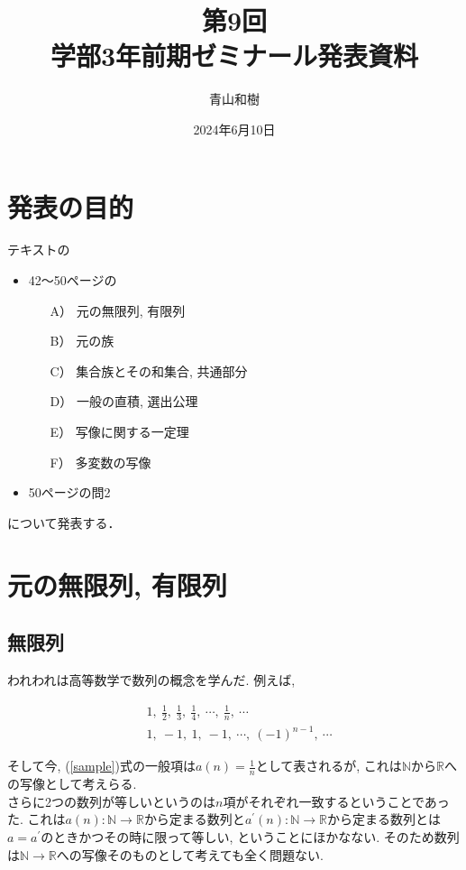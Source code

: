 \documentclass[a4j]{jsarticle}
\title{第9回\\学部3年前期ゼミナール発表資料}
\author{青山和樹}
\date{2024年6月10日}
\begin{document}
\maketitle

\section*{発表の目的}
テキスト\cite{text}の
\begin{itemize}
  \item 42～50ページの
        \begin{itemize}
          \item[A）] 元の無限列, 有限列
          \item[B）] 元の族
          \item[C）] 集合族とその和集合, 共通部分
          \item[D）] 一般の直積, 選出公理
          \item[E）] 写像に関する一定理
          \item[F）] 多変数の写像
        \end{itemize}
  \item 50ページの問2
\end{itemize}
について発表する．

\tableofcontents

\clearpage

\section{元の無限列, 有限列}

\subsection{無限列}

われわれは高等数学で数列の概念を学んだ. 例えば,

\begin{align}
  \label{sample}
   & 1,\:\frac{1}{2},\:\frac{1}{3},\:\frac{1}{4},\:\cdots,\:\frac{1}{n},\:\cdots \\
   & 1,\:-1,\:1,\:-1,\:\cdots,\:(-1)^{n-1},\:\cdots
\end{align}

そして今, (\ref{sample})式の一般項は$a(n)=\frac{1}{n}$として表されるが, これは$\mathbb{N}$から$\mathbb{R}$への写像として考えらる. \\
さらに2つの数列が等しいというのは$n$項がそれぞれ一致するということであった. これは$a(n) : \mathbb{N} \rightarrow \mathbb{R}$から定まる数列と$a^{\prime}(n) : \mathbb{N} \rightarrow \mathbb{R}$から定まる数列とは$a=a^{\prime}$のときかつその時に限って等しい, ということにほかなない. そのため数列は$\mathbb{N} \rightarrow \mathbb{R}$への写像そのものとして考えても全く問題ない. \\
\end{document}
